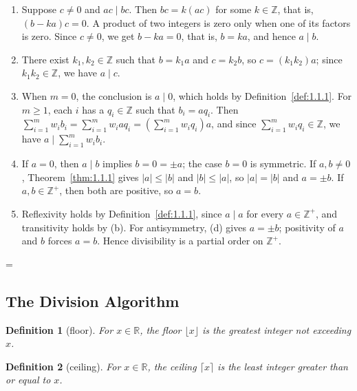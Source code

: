 \documentclass[11pt]{article}
\makeatletter
\let\nt@closedisplay\]
\def\nt@guardedclose{\@ifnextchar\par{\nt@closeafterpar}{\@ifnextchar\end{\postdisplaypenalty\@M\nt@closedisplay}{\nt@closedisplay}}}
\def\nt@closeafterpar\par{\@ifnextchar\par{\nt@closeafterpar}{\@ifnextchar\end{\postdisplaypenalty\@M\nt@closedisplay\par}{\nt@closedisplay\par}}}
\renewenvironment{proof}[1][\proofname]{\par
  \pushQED{\qed}\normalfont\topsep\medskipamount\edef\nt@afterproof{\@endparpenalty=\the\@endparpenalty\relax}\@beginparpenalty\@M\@endparpenalty\@M\let\]\nt@guardedclose\trivlist\item[]\textit{#1\@addpunct{.}} \ignorespaces}{\ifvmode\addpenalty\@M\fi\popQED\nt@afterproof\endtrivlist\@endpefalse}
\theoremstyle{ntstyle}
\newtheorem{definition}{Definition}[subsection]
\makeatother
\begin{document}
\begin{proof}

  \begin{enumerate}[label={\alph*)}]
    \item Suppose $c \neq 0$ and $ac \mid bc$. Then $bc = k(ac)$ for
          some $k \in \mathbb{Z}$, that is, $(b - ka)c = 0$. A product of two integers is zero only when one of its
          factors is zero. Since $c \neq 0$, we get $b - ka = 0$, that is, $b = ka$, and hence $a \mid b$.
    \item There exist $k_1, k_2 \in \mathbb{Z}$ such that $b = k_1 a$
          and $c = k_2 b$, so $c = (k_1 k_2) a$; since $k_1 k_2 \in \mathbb{Z}$, we have $a \mid c$.
    \item When $m=0$, the conclusion is $a\mid0$, which holds by
          Definition~\ref{def:1.1.1}. For $m\ge1$, each $i$ has a $q_i\in\mathbb{Z}$ such that
          $b_i = a q_i$. Then
          $\sum_{i=1}^{m} w_i b_i = \sum_{i=1}^{m} w_i a q_i = \left(\sum_{i=1}^{m} w_i q_i\right) a$, and since
          $\sum_{i=1}^{m} w_i q_i \in \mathbb{Z}$, we have $a \mid \sum_{i=1}^{m} w_i b_i$.
    \item If $a = 0$, then $a \mid b$ implies $b = 0 = \pm a$;
          the case $b = 0$ is symmetric. If $a, b \neq 0$, Theorem~\ref{thm:1.1.1} gives
          $|a| \le |b|$ and $|b| \le |a|$, so $|a| = |b|$ and $a = \pm b$.
          If $a, b \in \mathbb{Z}^+$, then both are positive, so $a = b$.
    \item Reflexivity holds by Definition~\ref{def:1.1.1}, since
          $a\mid a$ for every $a\in\mathbb{Z}^+$, and transitivity holds by (b).
          For antisymmetry, (d) gives $a=\pm b$; positivity of $a$ and $b$
          forces $a=b$. Hence divisibility is a partial order on $\mathbb{Z}^+$.\qedhere
\end{enumerate}
\end{proof}
\subsection{The Division Algorithm}

\begin{definition}[floor]\label{def:1.2.1}\label{def:floor}
  For $x\in\mathbb{R}$, the floor $\lfloor x\rfloor$ is the greatest integer
  not exceeding $x$.

\end{definition}

\begin{definition}[ceiling]\label{def:1.2.2}\label{def:ceiling} For $x\in\mathbb{R}$,
  the ceiling $\lceil x\rceil$ is the least integer greater than or equal to $x$.

\end{definition}
\end{document}
